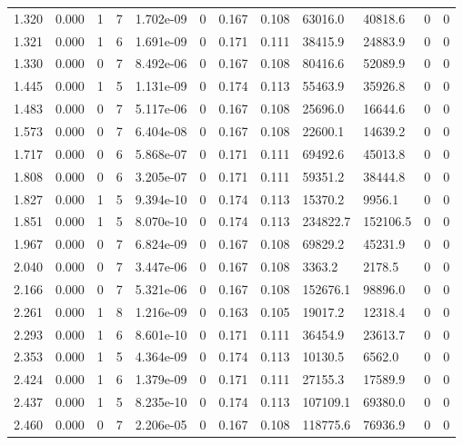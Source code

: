 \documentclass[preview]{standalone}
\begin{document}
{{\begin{tabular}{L{1.2cm}C{1.2cm} C{0.3cm}C{0.5cm} C{1.4cm}C{1.4cm} C{1.4cm}C{1.4cm} C{1.6cm}C{1.6cm} C{1.6cm}C{1.6cm}}
  1.320  &  0.000  & 1     &  7 &  1.702e-09  & 0  &  0.167&   0.108& 63016.0 & 40818.6   &  0 & 0  \\ 
  1.321  &  0.000  & 1     &  6 &  1.691e-09  & 0  &  0.171&   0.111& 38415.9 & 24883.9   &  0 & 0  \\ 
  1.330  &  0.000  & 0     &  7 &  8.492e-06  & 0  &  0.167&   0.108& 80416.6 & 52089.9   &  0 & 0  \\ 
  1.445  &  0.000  & 1     &  5 &  1.131e-09  & 0  &  0.174&   0.113& 55463.9 & 35926.8   &  0 & 0  \\ 
  1.483  &  0.000  & 0     &  7 &  5.117e-06  & 0  &  0.167&   0.108& 25696.0 & 16644.6   &  0 & 0  \\ 
  1.573  &  0.000  & 0     &  7 &  6.404e-08  & 0  &  0.167&   0.108& 22600.1 & 14639.2   &  0 & 0  \\ 
  1.717  &  0.000  & 0     &  6 &  5.868e-07  & 0  &  0.171&   0.111& 69492.6 & 45013.8   &  0 & 0  \\ 
  1.808  &  0.000  & 0     &  6 &  3.205e-07  & 0  &  0.171&   0.111& 59351.2 & 38444.8   &  0 & 0  \\ 
  1.827  &  0.000  & 1     &  5 &  9.394e-10  & 0  &  0.174&   0.113& 15370.2 & 9956.1   &  0 & 0  \\ 
  1.851  &  0.000  & 1     &  5 &  8.070e-10  & 0  &  0.174&   0.113& 234822.7 & 152106.5   &  0 & 0  \\ 
  1.967  &  0.000  & 0     &  7 &  6.824e-09  & 0  &  0.167&   0.108& 69829.2 & 45231.9   &  0 & 0  \\ 
  2.040  &  0.000  & 0     &  7 &  3.447e-06  & 0  &  0.167&   0.108& 3363.2 & 2178.5   &  0 & 0  \\ 
  2.166  &  0.000  & 0     &  7 &  5.321e-06  & 0  &  0.167&   0.108& 152676.1 & 98896.0   &  0 & 0  \\ 
  2.261  &  0.000  & 1     &  8 &  1.216e-09  & 0  &  0.163&   0.105& 19017.2 & 12318.4   &  0 & 0  \\ 
  2.293  &  0.000  & 1     &  6 &  8.601e-10  & 0  &  0.171&   0.111& 36454.9 & 23613.7   &  0 & 0  \\ 
  2.353  &  0.000  & 1     &  5 &  4.364e-09  & 0  &  0.174&   0.113& 10130.5 & 6562.0   &  0 & 0  \\ 
  2.424  &  0.000  & 1     &  6 &  1.379e-09  & 0  &  0.171&   0.111& 27155.3 & 17589.9   &  0 & 0  \\ 
  2.437  &  0.000  & 1     &  5 &  8.235e-10  & 0  &  0.174&   0.113& 107109.1 & 69380.0   &  0 & 0  \\ 
  2.460  &  0.000  & 0     &  7 &  2.206e-05  & 0  &  0.167&   0.108& 118775.6 & 76936.9   &  0 & 0  \\ 

\end{tabular}}}
\end{document}
